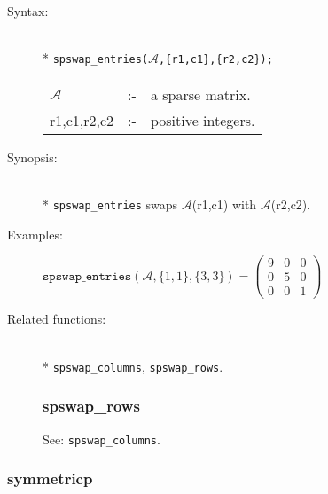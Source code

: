 \begin{description}
\item[Syntax:]\mbox{}\\*
\texttt{spswap\_entries($\mathcal{A}$,\{r1,c1\},\{r2,c2\});}\\[2mm]
\begin{tabular}{l l l} 
$\mathcal{A}$  &:-& a sparse matrix. \\
r1,c1,r2,c2 &:-& positive integers.
\end{tabular}

\item[Synopsis:]\mbox{}\\*
\texttt{spswap\_entries} swaps $\mathcal{A}$(r1,c1) with 
                $\mathcal{A}$(r2,c2).

\item[Examples:]
\begin{flushleft}  
\begin{math}  
\texttt{spswap\_entries}(\mathcal{A},\{1,1\},\{3,3\}) =
        \begin{pmatrix} 9 & 0 & 0 \\ 0 & 5 & 0 \\ 0 & 0 & 1 \end{pmatrix} 
\end{math}  
\end{flushleft}

\item[Related functions:]\mbox{}\\*
\texttt{spswap\_columns}, \texttt{spswap\_rows}.


\subsubsection{spswap\_rows}
\label{sparse:spswap_rows}
See: \texttt{spswap\_columns}.
\end{description}

\subsubsection{symmetricp}
\label{sparse:symmetricp}

